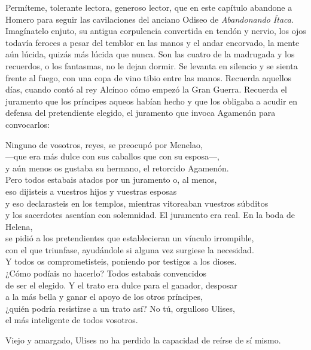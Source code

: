 Permíteme, tolerante lectora, generoso lector, que en este capítulo abandone a Homero para seguir las cavilaciones del anciano Odiseo de \emph{Abandonando Ítaca}. Imagínatelo enjuto, su antigua corpulencia convertida en tendón y nervio, los ojos todavía feroces a pesar del temblor en las manos y el andar encorvado, la mente aún lúcida, quizás más lúcida que nunca. Son las cuatro de la madrugada y los recuerdos, o los fantasmas, no le dejan dormir. Se levanta en silencio y se sienta frente al fuego, con una copa de vino tibio entre las manos. Recuerda aquellos días, cuando contó al rey Alcínoo cómo empezó la Gran Guerra.
Recuerda el juramento que los príncipes aqueos habían hecho y que los obligaba a acudir en defensa del pretendiente elegido, el juramento que invoca Agamenón para convocarlos:
\begin{versopropio}
Ninguno de vosotros, reyes, se preocupó por Menelao,\\
---que era más dulce con sus caballos que con su esposa---,\\
y aún menos os gustaba su hermano, el retorcido Agamenón.\\
Pero todos estabais atados por un juramento o, al menos,\\
eso dijisteis a vuestros hijos y vuestras esposas\\
y eso declarasteis en los templos, mientras vitoreaban vuestros súbditos\\
y los sacerdotes asentían con solemnidad.
\stanzabreak
El juramento era real. En la boda de Helena,\\
se pidió a los pretendientes que establecieran un vínculo irrompible,\\
con el que triunfase, ayudándole si alguna vez surgiese la necesidad.\\
Y todos os comprometisteis, poniendo por testigos a los dioses.\\
¿Cómo podíais no hacerlo? Todos estabais convencidos\\
de ser el elegido. Y el trato era dulce para el ganador, desposar\\
a la más bella y ganar el apoyo de los otros príncipes,\\
¿quién podría resistirse a un trato así? No tú, orgulloso Ulises,\\
el más inteligente de todos vosotros.
\end{versopropio}
Viejo y amargado, Ulises no ha perdido la capacidad de reírse de sí mismo.
